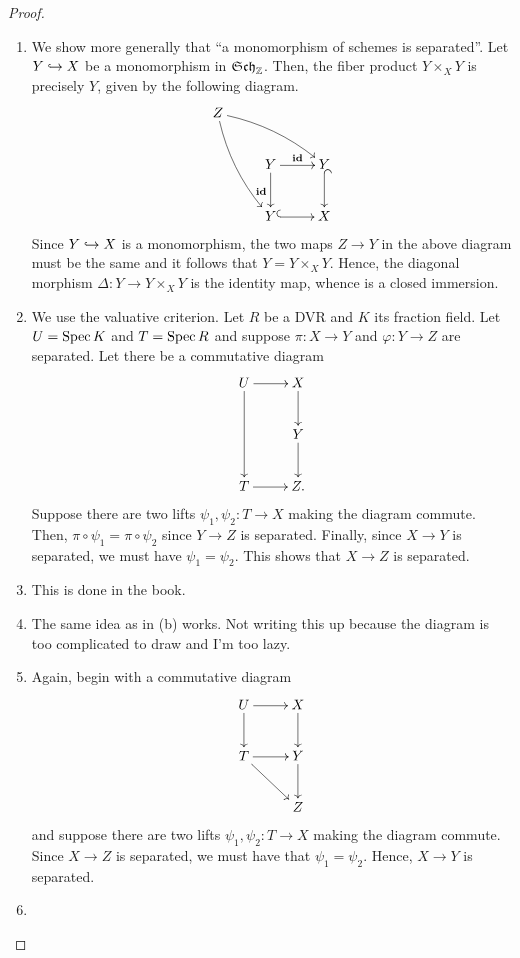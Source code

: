 \begin{proof}
\begin{enumerate}[label=(\alph*)]
\item We show more generally that ``a monomorphism of schemes is separated''. Let $Y\hookrightarrow X$ be a monomorphism in $\mathfrak{Sch}_{\mathbb{Z}}$. Then, the fiber product $Y\times_X Y$ is precisely $Y$, given by the following diagram. 
\begin{equation*}
    \xymatrix {
    Z\ar@/^/[rrd]\ar@/_/[rdd] & & \\
        &Y\ar[d]_\id\ar[r]^\id & Y\ar@{^(->}[d]\\
        &Y\ar@{^(->}[r] & X
    }
\end{equation*}
Since $Y\hookrightarrow X$ is a monomorphism, the two maps $Z\to Y$ in the above diagram must be the same and it follows that $Y = Y\times_X Y$. Hence, the diagonal morphism $\Delta: Y\to Y\times_X Y$ is the identity map, whence is a closed immersion.

\item We use the valuative criterion. Let $R$ be a DVR and $K$ its fraction field. Let $U = \operatorname{Spec} K$ and $T = \operatorname{Spec} R$ and suppose $\pi: X\to Y$ and $\varphi: Y\to Z$ are separated. Let there be a commutative diagram 
\begin{equation*}
    \xymatrix {
        U\ar[r]\ar[dd] & X\ar[d]\\
        & Y\ar[d]\\
        T\ar[r] & Z.
    }
\end{equation*}
Suppose there are two lifts $\psi_1,\psi_2: T\to X$ making the diagram commute. Then, $\pi\circ\psi_1 = \pi\circ\psi_2$ since $Y\to Z$ is separated. Finally, since $X\to Y$ is separated, we must have $\psi_1 = \psi_2$. This shows that $X\to Z$ is separated.

\item This is done in the book. 

\item The same idea as in (b) works. Not writing this up because the diagram is too complicated to draw and I'm too lazy.

\item Again, begin with a commutative diagram 
\begin{equation*}
    \xymatrix {
        U\ar[r]\ar[d] & X\ar[d]\\
        T\ar[r]\ar[rd] & Y\ar[d]\\
        & Z
    }
\end{equation*}
and suppose there are two lifts $\psi_1,\psi_2: T\to X$ making the diagram commute. Since $X\to Z$ is separated, we must have that $\psi_1 = \psi_2$. Hence, $X\to Y$ is separated.

\item 
\end{enumerate}
\end{proof}